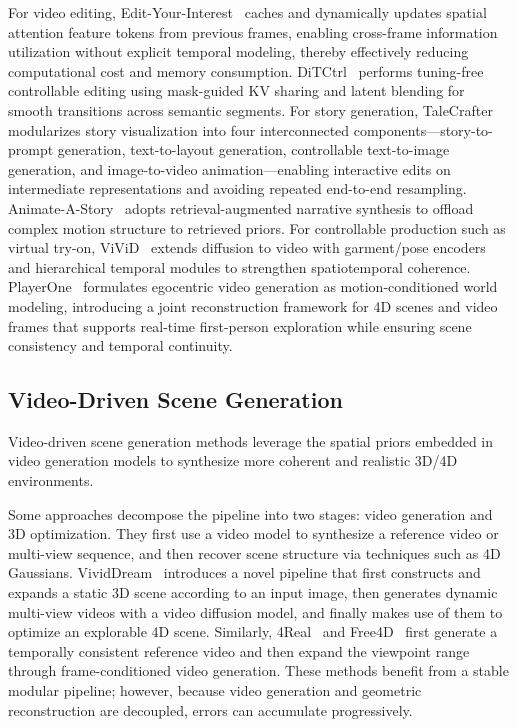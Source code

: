 \documentclass[lettersize,journal]{IEEEtran}
\begin{document}
For video editing, Edit-Your-Interest~\cite{zuo2025edit} caches and dynamically updates spatial attention feature tokens from previous frames, enabling cross-frame information utilization without explicit temporal modeling, thereby effectively reducing computational cost and memory consumption. DiTCtrl~\cite{cai2025ditctrl} performs tuning-free controllable editing using mask-guided KV sharing and latent blending for smooth transitions across semantic segments. For story generation, TaleCrafter~\cite{gong2023talecrafter} modularizes story visualization into four interconnected components—story-to-prompt generation, text-to-layout generation, controllable text-to-image generation, and image-to-video animation—enabling interactive edits on intermediate representations and avoiding repeated end-to-end resampling. Animate-A-Story~\cite{he2023animate} adopts retrieval-augmented narrative synthesis to offload complex motion structure to retrieved priors. For controllable production such as virtual try-on, ViViD~\cite{fang2024vivid} extends diffusion to video with garment/pose encoders and hierarchical temporal modules to strengthen spatiotemporal coherence. PlayerOne~\cite{tu2025PlayerOne} formulates egocentric video generation as motion-conditioned world modeling, introducing a joint reconstruction framework for 4D scenes and video frames that supports real-time first-person exploration while ensuring scene consistency and temporal continuity.

\subsection{Video-Driven Scene Generation}
Video-driven scene generation methods leverage the spatial priors embedded in video generation models to synthesize more coherent and realistic 3D/4D environments.

Some approaches decompose the pipeline into two stages: video generation and 3D optimization. They first use a video model to synthesize a reference video or multi-view sequence, and then recover scene structure via techniques such as 4D Gaussians. VividDream~\cite{lee2024vividdreamgenerating3dscene} introduces a novel pipeline that first constructs and expands a static 3D scene according to an input image, then generates dynamic multi-view videos with a video diffusion model, and finally makes use of them to optimize an explorable 4D scene. Similarly, 4Real~\cite{yu2024real} and Free4D~\cite{liu2025free4dtuningfree4dscene} first generate a temporally consistent reference video and then expand the viewpoint range through frame-conditioned video generation. These methods benefit from a stable modular pipeline; however, because video generation and geometric reconstruction are decoupled, errors can accumulate progressively.
\end{document}
